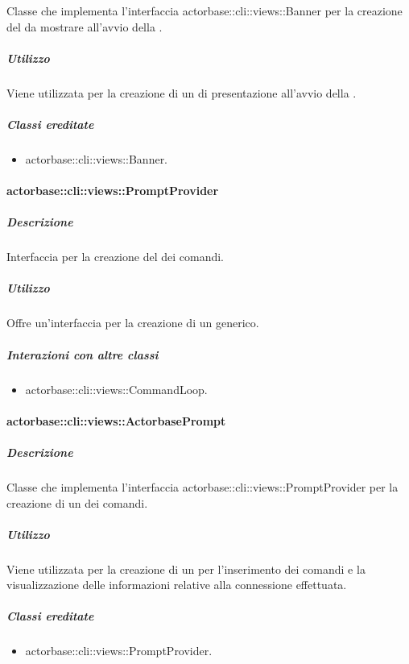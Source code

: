\documentclass{scalatekids-article}
\begin{document}
Classe che implementa l'interfaccia actorbase::cli::views::Banner per la
creazione del  da mostrare all'avvio della .

\subparagraph{Utilizzo}

Viene utilizzata per la creazione di un  di presentazione
all'avvio della .

\subparagraph{Classi ereditate}

\begin{itemize}
\item actorbase::cli::views::Banner.
\end{itemize}

\paragraph{actorbase::cli::views::PromptProvider}

\subparagraph{Descrizione}

Interfaccia per la creazione del  dei comandi.

\subparagraph{Utilizzo}

Offre un'interfaccia per la creazione di un  generico.

\subparagraph{Interazioni con altre classi}

\begin{itemize}
\item actorbase::cli::views::CommandLoop.
\end{itemize}

\paragraph{actorbase::cli::views::ActorbasePrompt}

\subparagraph{Descrizione}

Classe che implementa l'interfaccia actorbase::cli::views::PromptProvider per
la creazione di un  dei comandi.

\subparagraph{Utilizzo}

Viene utilizzata per la creazione di un  per l'inserimento dei
comandi e la visualizzazione delle informazioni relative alla connessione
effettuata. %

\subparagraph{Classi ereditate}

\begin{itemize}
\item actorbase::cli::views::PromptProvider.
\end{itemize}
\end{document}
